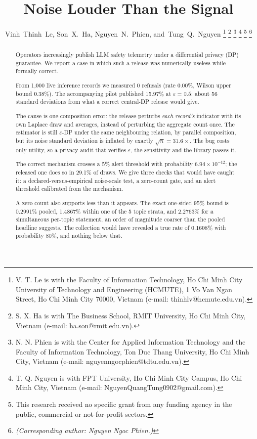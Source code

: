 \documentclass[journal]{IEEEtran}
\theoremstyle{definition}
\newcommand{\Nrec}{1{,}000}
\newcommand{\Nrefused}{0}
\newcommand{\Truerate}{0.00}
\newcommand{\WilsonUp}{0.38}
\newcommand{\AlarmTau}{5}
\newcommand{\WorstEps}{0.5}
\newcommand{\WorstRelease}{15.97}
\newcommand{\WorstErrSD}{56}
\newcommand{\Inflation}{31.6}
\newcommand{\PerAlarmhalf}{29.1}
\newcommand{\LapAlarmExact}{$6.94\times 10^{-12}$}
\newcommand{\TNstrata}{5}
\newcommand{\TCpPooled}{0.2991}
\newcommand{\TCpPerStratum}{1.4867}
\newcommand{\TBonf}{2.2763}
\newcommand{\TDetectPooled}{0.1608}
\begin{document}
\title{Noise Louder Than the Signal}

\author{%
  Vinh~Thinh~Le,
  Son~X.~Ha,
  Nguyen~N.~Phien,
  and~Tung~Q.~Nguyen%
  \thanks{V. T. Le is with the Faculty of Information Technology,
    Ho Chi Minh City University of Technology and Engineering (HCMUTE),
    1 Vo Van Ngan Street, Ho Chi Minh City 70000, Vietnam
    (e-mail: thinhlv@hcmute.edu.vn).}%
  \thanks{S. X. Ha is with The Business School, RMIT University,
    Ho Chi Minh City, Vietnam (e-mail: ha.son@rmit.edu.vn).}%
  \thanks{N. N. Phien is with the Center for Applied Information
    Technology and the Faculty of Information Technology, Ton Duc Thang
    University, Ho Chi Minh City, Vietnam
    (e-mail: nguyenngocphien@tdtu.edu.vn).}%
  \thanks{T. Q. Nguyen is with FPT University, Ho Chi Minh City Campus,
    Ho Chi Minh City, Vietnam (e-mail: NguyenQuangTung0902@gmail.com).}%
  \thanks{This research received no specific grant from any funding agency in the public, commercial or not-for-profit sectors.}%
  \thanks{\emph{(Corresponding author: Nguyen Ngoc Phien.)}}%
}

\maketitle

\begin{abstract}
Operators increasingly publish LLM safety telemetry under a differential
privacy (DP) guarantee. We report a case in which such a release was
numerically useless while formally correct.

From \Nrec{} live inference records we measured \Nrefused{} refusals
(rate \Truerate\%, Wilson upper bound \WilsonUp\%). The accompanying pilot
published \WorstRelease\% at $\varepsilon=\WorstEps$: about
\WorstErrSD{} standard deviations from what a correct central-DP release would
give.

The cause is one composition error: the release perturbs \emph{each record's}
indicator with its own Laplace draw and averages, instead of perturbing the
aggregate count once. The estimator is still $\varepsilon$-DP under the same
neighbouring relation, by parallel composition, but its noise standard deviation
is inflated by exactly $\sqrt{n} = \Inflation\times$. The bug costs
only utility, so a privacy audit that verifies $\varepsilon$, the sensitivity
and the library passes it.

The correct mechanism crosses a $\AlarmTau\%$ alert threshold with probability
\LapAlarmExact{}; the released one does so in \PerAlarmhalf\% of draws. We give three checks that would have caught it: a
declared-versus-empirical noise-scale test, a zero-count gate, and an alert
threshold calibrated from the mechanism.

A zero count also supports less than it appears. The exact one-sided $95$\%
bound is \TCpPooled\% pooled, \TCpPerStratum\% within one of the \TNstrata{}
topic strata, and \TBonf\% for a simultaneous per-topic statement, an order of
magnitude coarser than the pooled headline suggests. The collection would have
revealed a true rate of \TDetectPooled\% with probability $80$\%, and nothing
below that.
\end{abstract}
\end{document}
